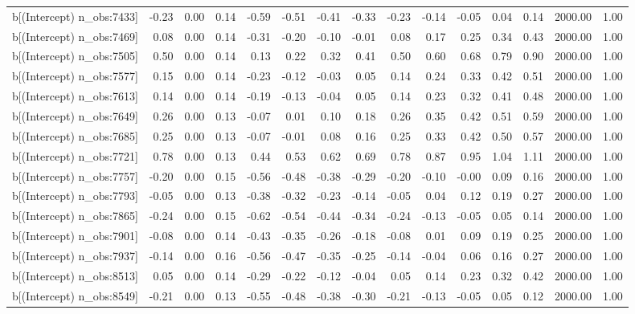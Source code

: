 \begin{table}[ht]
\begin{tabular}{rrrrrrrrrrrrrrr}
  b[(Intercept) n\_obs:7433] & -0.23 & 0.00 & 0.14 & -0.59 & -0.51 & -0.41 & -0.33 & -0.23 & -0.14 & -0.05 & 0.04 & 0.14 & 2000.00 & 1.00 \\ 
  b[(Intercept) n\_obs:7469] & 0.08 & 0.00 & 0.14 & -0.31 & -0.20 & -0.10 & -0.01 & 0.08 & 0.17 & 0.25 & 0.34 & 0.43 & 2000.00 & 1.00 \\ 
  b[(Intercept) n\_obs:7505] & 0.50 & 0.00 & 0.14 & 0.13 & 0.22 & 0.32 & 0.41 & 0.50 & 0.60 & 0.68 & 0.79 & 0.90 & 2000.00 & 1.00 \\ 
  b[(Intercept) n\_obs:7577] & 0.15 & 0.00 & 0.14 & -0.23 & -0.12 & -0.03 & 0.05 & 0.14 & 0.24 & 0.33 & 0.42 & 0.51 & 2000.00 & 1.00 \\ 
  b[(Intercept) n\_obs:7613] & 0.14 & 0.00 & 0.14 & -0.19 & -0.13 & -0.04 & 0.05 & 0.14 & 0.23 & 0.32 & 0.41 & 0.48 & 2000.00 & 1.00 \\ 
  b[(Intercept) n\_obs:7649] & 0.26 & 0.00 & 0.13 & -0.07 & 0.01 & 0.10 & 0.18 & 0.26 & 0.35 & 0.42 & 0.51 & 0.59 & 2000.00 & 1.00 \\ 
  b[(Intercept) n\_obs:7685] & 0.25 & 0.00 & 0.13 & -0.07 & -0.01 & 0.08 & 0.16 & 0.25 & 0.33 & 0.42 & 0.50 & 0.57 & 2000.00 & 1.00 \\ 
  b[(Intercept) n\_obs:7721] & 0.78 & 0.00 & 0.13 & 0.44 & 0.53 & 0.62 & 0.69 & 0.78 & 0.87 & 0.95 & 1.04 & 1.11 & 2000.00 & 1.00 \\ 
  b[(Intercept) n\_obs:7757] & -0.20 & 0.00 & 0.15 & -0.56 & -0.48 & -0.38 & -0.29 & -0.20 & -0.10 & -0.00 & 0.09 & 0.16 & 2000.00 & 1.00 \\ 
  b[(Intercept) n\_obs:7793] & -0.05 & 0.00 & 0.13 & -0.38 & -0.32 & -0.23 & -0.14 & -0.05 & 0.04 & 0.12 & 0.19 & 0.27 & 2000.00 & 1.00 \\ 
  b[(Intercept) n\_obs:7865] & -0.24 & 0.00 & 0.15 & -0.62 & -0.54 & -0.44 & -0.34 & -0.24 & -0.13 & -0.05 & 0.05 & 0.14 & 2000.00 & 1.00 \\ 
  b[(Intercept) n\_obs:7901] & -0.08 & 0.00 & 0.14 & -0.43 & -0.35 & -0.26 & -0.18 & -0.08 & 0.01 & 0.09 & 0.19 & 0.25 & 2000.00 & 1.00 \\ 
  b[(Intercept) n\_obs:7937] & -0.14 & 0.00 & 0.16 & -0.56 & -0.47 & -0.35 & -0.25 & -0.14 & -0.04 & 0.06 & 0.16 & 0.27 & 2000.00 & 1.00 \\ 
  b[(Intercept) n\_obs:8513] & 0.05 & 0.00 & 0.14 & -0.29 & -0.22 & -0.12 & -0.04 & 0.05 & 0.14 & 0.23 & 0.32 & 0.42 & 2000.00 & 1.00 \\ 
  b[(Intercept) n\_obs:8549] & -0.21 & 0.00 & 0.13 & -0.55 & -0.48 & -0.38 & -0.30 & -0.21 & -0.13 & -0.05 & 0.05 & 0.12 & 2000.00 & 1.00 \\ 

\end{tabular}
\end{table}
